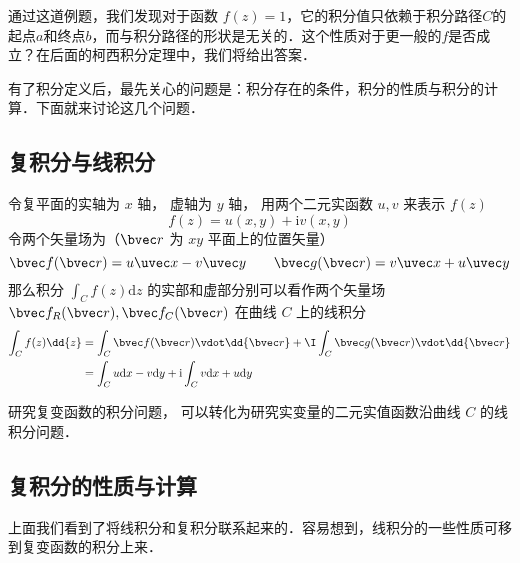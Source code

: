 通过这道例题，我们发现对于函数 $f(z)=1$，它的积分值只依赖于积分路径$C$的起点$a$和终点$b$，而与积分路径的形状是无关的．这个性质对于更一般的$f$是否成立？在后面的柯西积分定理中，我们将给出答案．

有了积分定义后，最先关心的问题是：积分存在的条件，积分的性质与积分的计算．下面就来讨论这几个问题．

\subsection{复积分与线积分}
\begin{theorem}{}
令复平面的实轴为 $x$ 轴， 虚轴为 $y$ 轴， 用两个二元实函数 $u, v$ 来表示 $f(z)$
\begin{equation}
f (z) = u(x, y) + \mathrm iv(x, y)
\end{equation}
令两个矢量场为（$\bvec r$ 为 $xy$ 平面上的位置矢量）
\begin{equation}
\bvec f(\bvec r) = u\uvec x - v\uvec y
\qquad
\bvec g(\bvec r) = v\uvec x + u\uvec y
\end{equation}
那么积分 $\int_{C} f(z) \mathrm{d} z$ 的实部和虚部分别可以看作两个矢量场 $\bvec f_R(\bvec r), \bvec f_C(\bvec r)$ 在曲线 $C$ 上的线积分
\begin{equation}
\begin{aligned}
\int_{C} f(z) \dd{z} &= \int_C \bvec f(\bvec r) \vdot \dd{\bvec r} + \I \int_C \bvec g(\bvec r) \vdot \dd{\bvec r}\\
&= \int_{C} u \mathrm{d} x-v \mathrm{d} y+\mathrm{i} \int_{C} v \mathrm{d} x+u \mathrm{d} y
\end{aligned}
\end{equation}

\end{theorem}

研究复变函数的积分问题， 可以转化为研究实变量的二元实值函数沿曲线 $C$ 的线积分问题．

\subsection{复积分的性质与计算}

上面我们看到了将线积分和复积分联系起来的．容易想到，线积分的一些性质可移到复变函数的积分上来．

